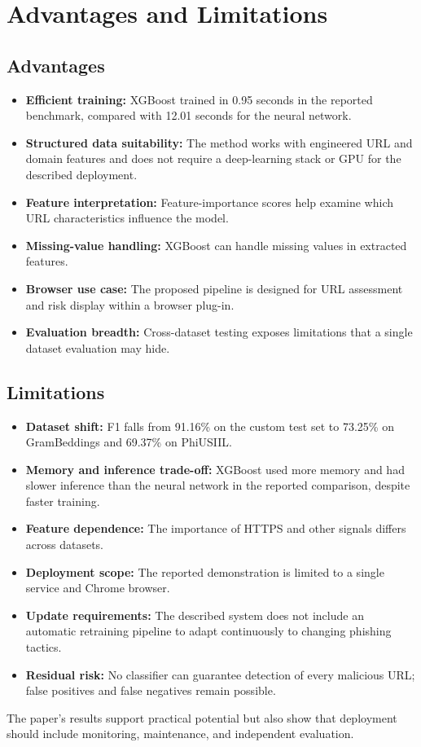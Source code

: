 \chapter{Advantages and Limitations}
\setcounter{equation}{0}
\section{Advantages}
\begin{itemize}
\item \textbf{Efficient training:} XGBoost trained in 0.95 seconds in the reported benchmark, compared with 12.01 seconds for the neural network.
\item \textbf{Structured data suitability:} The method works with engineered URL and domain features and does not require a deep-learning stack or GPU for the described deployment.
\item \textbf{Feature interpretation:} Feature-importance scores help examine which URL characteristics influence the model.
\item \textbf{Missing-value handling:} XGBoost can handle missing values in extracted features.
\item \textbf{Browser use case:} The proposed pipeline is designed for URL assessment and risk display within a browser plug-in.
\item \textbf{Evaluation breadth:} Cross-dataset testing exposes limitations that a single dataset evaluation may hide.
\end{itemize}

\section{Limitations}
\begin{itemize}
\item \textbf{Dataset shift:} F1 falls from 91.16\% on the custom test set to 73.25\% on GramBeddings and 69.37\% on PhiUSIIL.
\item \textbf{Memory and inference trade-off:} XGBoost used more memory and had slower inference than the neural network in the reported comparison, despite faster training.
\item \textbf{Feature dependence:} The importance of HTTPS and other signals differs across datasets.
\item \textbf{Deployment scope:} The reported demonstration is limited to a single service and Chrome browser.
\item \textbf{Update requirements:} The described system does not include an automatic retraining pipeline to adapt continuously to changing phishing tactics.
\item \textbf{Residual risk:} No classifier can guarantee detection of every malicious URL; false positives and false negatives remain possible.
\end{itemize}

The paper's results support practical potential but also show that deployment should include monitoring, maintenance, and independent evaluation.
